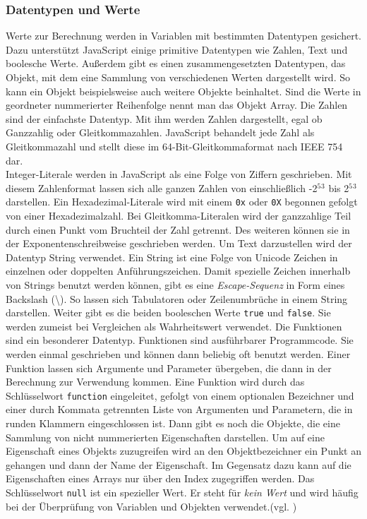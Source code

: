 \subsubsection{Datentypen und Werte} Werte zur Berechnung werden in Variablen mit bestimmten Datentypen gesichert. Dazu unterstützt JavaScript einige primitive Datentypen wie Zahlen, Text und boolesche Werte. Außerdem gibt es einen zusammengesetzten Datentypen, das Objekt, mit dem eine Sammlung von verschiedenen Werten dargestellt wird. So kann ein Objekt beispielsweise auch weitere Objekte beinhaltet. Sind die Werte in geordneter nummerierter Reihenfolge nennt man das Objekt Array. Die Zahlen sind der einfachste Datentyp. Mit ihm werden Zahlen dargestellt, egal ob Ganzzahlig oder Gleitkommazahlen. JavaScript behandelt jede Zahl als Gleitkommazahl und stellt diese im 64-Bit-Gleitkommaformat nach IEEE 754 dar.\\Integer-Literale werden in JavaScript als eine Folge von Ziffern geschrieben. Mit diesem Zahlenformat lassen sich alle ganzen Zahlen von einschließlich -2$^5$$^3$ bis 2$^5$$^3$ darstellen. Ein Hexadezimal-Literale wird mit einem \texttt{0x} oder \texttt{0X} begonnen gefolgt von einer Hexadezimalzahl. Bei Gleitkomma-Literalen wird der ganzzahlige Teil durch einen Punkt vom Bruchteil der Zahl getrennt. Des weiteren können sie in der Exponentenschreibweise geschrieben werden. Um Text darzustellen wird der Datentyp String verwendet. Ein String ist eine Folge von Unicode Zeichen in einzelnen oder doppelten Anführungszeichen. Damit spezielle Zeichen innerhalb von Strings benutzt werden können, gibt es eine \textit{Escape-Sequenz} in Form eines Backslash (\textbackslash). So lassen sich Tabulatoren oder Zeilenumbrüche in einem String darstellen. Weiter gibt es die beiden booleschen Werte \texttt{true} und \texttt{false}. Sie werden zumeist bei Vergleichen als Wahrheitswert verwendet. Die Funktionen sind ein besonderer Datentyp. Funktionen sind ausführbarer Programmcode. Sie werden einmal geschrieben und können dann beliebig oft benutzt werden. Einer Funktion lassen sich Argumente und Parameter übergeben, die dann in der Berechnung zur Verwendung kommen. Eine Funktion wird durch das Schlüsselwort \texttt{function} eingeleitet, gefolgt von einem optionalen Bezeichner und einer durch Kommata getrennten Liste von Argumenten und Parametern, die in runden Klammern eingeschlossen ist. Dann gibt es noch die Objekte, die eine Sammlung von nicht nummerierten Eigenschaften darstellen. Um auf eine Eigenschaft eines Objekts zuzugreifen wird an den Objektbezeichner ein Punkt an gehangen und dann der Name der Eigenschaft. Im Gegensatz dazu kann auf die Eigenschaften eines Arrays nur über den Index zugegriffen werden. Das Schlüsselwort \texttt{null} ist ein spezieller Wert. Er steht für \textit{kein Wert} und wird häufig bei der Überprüfung von Variablen und Objekten verwendet.(vgl. \cite[S.22ff]{FlanJava2007})
	
